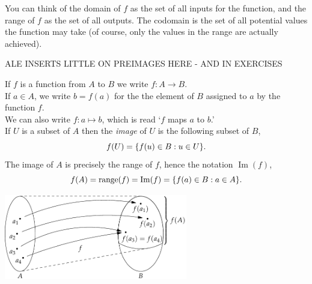  You can think of the domain of $f$ as the set of all inputs for the function, and the range of $f$ as the set of all outputs. The codomain is the set of all potential values the function may take (of course, only the values in the range are actually achieved).

 ALE INSERTS LITTLE ON PREIMAGES HERE - AND IN EXERCISES

If $f$ is a function from $A$ to $B$ we write $f:A\to B$.\\
If $a\in A$, we write $b=f(a)$ for the the element of $B$ assigned to $a$ by the function $f$.\\
We can also write $f:a\mapsto b$, which is read `$f$ maps $a$ to $b$.'\\
If $U$ is a subset of $A$ then the \emph{image} of $U$ is the following subset of $B$,\vspace{-4pt}
\[f(U)=\{f(u)\in B:u\in U\}.\vspace{-5pt}\]
The image of $A$ is precisely the range of $f$, hence the notation $\operatorname{Im}(f)$,\vspace{-4pt}
\[f(A)=\range(f)=\operatorname{Im}(f)=\{f(a)\in B:a\in A\}.\vspace{-2pt}\]


\begin{center}
\includegraphics[width=0.6\textwidth]{sets-16-funcdef}
\end{center}



